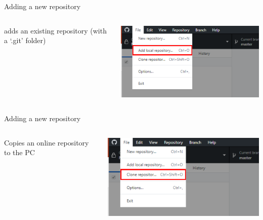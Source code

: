 \documentclass[10pt]{beamer}
\begin{document}
{\begin{frame}[fragile]{Adding a new repository}
\begin{columns}[T]
\begin{column}{.12\textwidth}
\small adds an existing repository (with a `.git' folder)
\end{column}
\begin{column}{.88\textwidth}
\includegraphics[width=10cm]{Figs/GHD/menu_03}
\end{column}
\end{columns}
\end{frame}

\begin{frame}[fragile]{Adding a new repository}
\begin{columns}[T]
\begin{column}{.12\textwidth}
\small Copies an online repository to the PC
\end{column}
\begin{column}{.88\textwidth}
\includegraphics[width=10cm]{Figs/GHD/menu_04}
\end{column}
\end{columns}
\end{frame}

}
\end{document}
